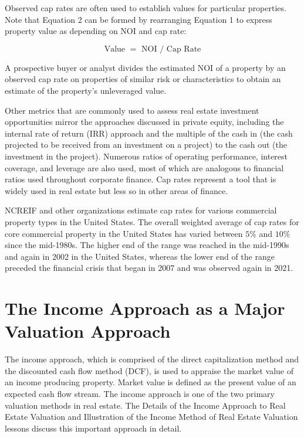 \documentclass[11pt]{article}
\begin{document}
Observed cap rates are often used to establish values for particular properties. Note that Equation 2 can be formed by rearranging Equation 1 to express property value as depending on $\mathrm{NOI}$ and cap rate:


\begin{equation*}
\text { Value }=\text { NOI } / \text { Cap Rate } \tag{2}
\end{equation*}


A prospective buyer or analyst divides the estimated NOI of a property by an observed cap rate on properties of similar risk or characteristics to obtain an estimate of the property's unleveraged value.

Other metrics that are commonly used to assess real estate investment opportunities mirror the approaches discussed in private equity, including the internal rate of return (IRR) approach and the multiple of the cash in (the cash projected to be received from an investment on a project) to the cash out (the investment in the project). Numerous ratios of operating performance, interest coverage, and leverage are also used, most of which are analogous to financial ratios used throughout corporate finance. Cap rates represent a tool that is widely used in real estate but less so in other areas of finance.

NCREIF and other organizations estimate cap rates for various commercial property types in the United States. The overall weighted average of cap rates for core commercial property in the United States has varied between $5 \%$ and $10 \%$ since the mid-1980s. The higher end of the range was reached in the mid-1990s and again in 2002 in the United States, whereas the lower end of the range preceded the financial crisis that began in 2007 and was observed again in 2021.

\section*{The Income Approach as a Major Valuation Approach}
The income approach, which is comprised of the direct capitalization method and the discounted cash flow method (DCF), is used to appraise the market value of an income producing property. Market value is defined as the present value of an expected cash flow stream. The income approach is one of the two primary valuation methods in real estate. The Details of the Income Approach to Real Estate Valuation and Illustration of the Income Method of Real Estate Valuation lessons discuss this important approach in detail.
\end{document}
